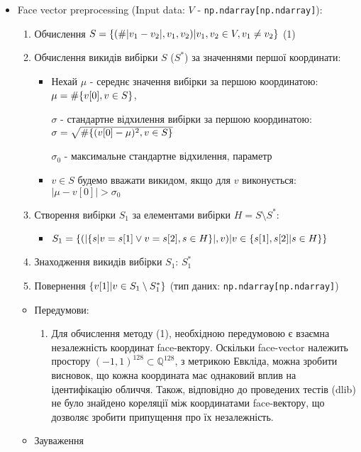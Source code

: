 \documentclass[11pt]{article}
\providecommand{\tightlist}{%
      \setlength{\itemsep}{0pt}\setlength{\parskip}{0pt}}
\begin{document}
    \begin{itemize}
\tightlist
\item
  Face vector preprocessing (Input data: \(V\) -
  \texttt{np.ndarray{[}np.ndarray{]}}):

  \begin{enumerate}
  \def\labelenumi{\arabic{enumi}.}
  \tightlist
  \item
    Обчислення
    \(S = \{(\#|v_1-v_2|, v_1, v_2) \space | \space v_1, v_2 \in V, v_1\neq v_2\}\)
    (1)
  \item
    Обчислення викидів вибірки \(S\) (\(S^*\)) за значеннями першої
    координати:

    \begin{itemize}
    \item
      Нехай \(\mu\) - середнє значення вибірки за першою координатою:
      \(\mu = \#\{v[0]\space,\space v \in S\}\),

      \(\sigma\) - стандартне відхилення вибірки за першою координатою:
      \(\sigma = \sqrt{\#\{(v[0]-\mu)^2\space,\space v \in S\}}\)

      \(\sigma_0\) - максимальне стандартне відхилення, параметр
    \item
      \(v \in S\) будемо вважати викидом, якщо для \(v\) виконується:
      \(|\mu-v[0]| > \sigma_0\)
    \end{itemize}
  \item
    Створення вибірки \(S_1\) за елементами вибірки
    \(H = S\setminus S^*\):

    \begin{itemize}
    \tightlist
    \item
      \(S_1 = \{(|\{s| v=s[1] \lor v=s[2], \space s \in H\}|, v) \space|\space v \in \{s[1],s[2] \space|\space s \in H\}\}\)
    \end{itemize}
  \item
    Знаходження викидів вибірки \(S_1\): \(S_1^*\)
  \item
    Повернення \(\{v[1]\space|\space v \in S_1 \setminus S_1^*\}\) (тип
    даних: \texttt{np.ndarray{[}np.ndarray{]}})
  \end{enumerate}

  \begin{itemize}
  \tightlist
  \item
    Передумови:

    \begin{enumerate}
    \def\labelenumi{\arabic{enumi}.}
    \tightlist
    \item
      Для обчислення методу (1), необхідною передумовою є взаємна
      незалежність координат face-вектору. Оскільки face-vector належить
      простору \((-1,1)^{128} \subset \mathbb{Q}^{128}\), з метрикою
      Евкліда, можна зробити висновок, що кожна координата має однаковий
      вплив на ідентифікацію обличчя. Також, відповідно до проведених
      тестів (dlib) не було знайдено кореляції між координатами
      face-вектору, що дозволяє зробити припущення про їх незалежність.
    \end{enumerate}
  \item
    Зауваження


\end{itemize}
\end{itemize}
\end{document}
